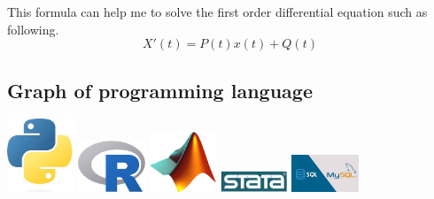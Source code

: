 This formula can help me to solve the first order differential equation such as following.
\begin{equation*}
X'(t) = P(t)x(t)+Q(t)
\end{equation*}



\subsection{Graph of programming language}
\begin{center}
\includegraphics[width=0.15\textwidth]{python.jpg}
\includegraphics[width=0.15\textwidth]{r.jpg}
\includegraphics[width=0.15\textwidth]{matlab.png}
\includegraphics[width=0.15\textwidth]{stata.png}
\includegraphics[width=0.15\textwidth]{sql.jpg}
\end{center}


